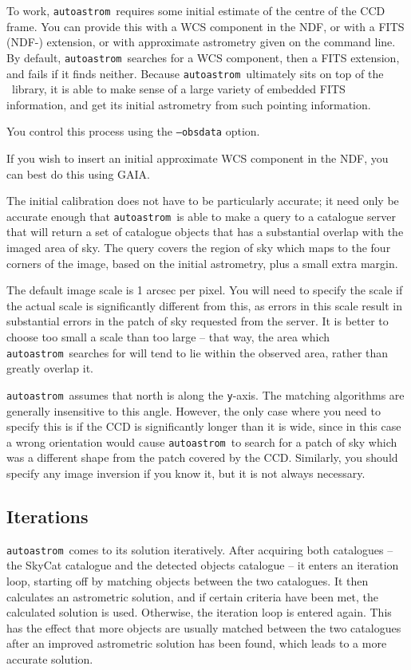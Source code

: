 \documentclass[twoside,11pt,nolof]{starlink}
\providecommand{\AST}{\xref{{\footnotesize AST}}{sun210}{}}
\providecommand{\autoastrom}{\texttt{autoastrom}}
\providecommand{\GAIA}{{\footnotesize GAIA}\normalsize}
\begin{document}
To work, \autoastrom\ requires some initial estimate of the centre of the CCD
frame. You can provide this with a WCS component in the NDF, or with a FITS
(NDF-) extension, or with approximate astrometry given on the command line.
By default, \autoastrom\ searches for a WCS component, then a FITS extension,
and fails if it finds neither.  Because \autoastrom\ ultimately sits on top of
the \AST\ library, it is able to make sense of a large variety of embedded
FITS information, and get its initial astrometry from such pointing
information.

  You control this process using the \texttt{--obsdata} option.

  If you wish to insert an initial approximate WCS component in the NDF, you
  can best do this using \GAIA.

  The initial calibration does not have to be particularly accurate; it need
  only be accurate enough that \autoastrom\ is able to make a query to a
  catalogue server that will return a set of catalogue objects that has a
  substantial overlap with the imaged area of sky.  The query covers the
  region of sky which maps to the four corners of the image, based on the
  initial astrometry, plus a small extra margin.

  The default image scale is 1 arcsec per pixel.  You will need to specify the
  scale if the actual scale is significantly different from this, as errors in
  this scale result in substantial errors in the patch of sky requested from
  the server.  It is better to choose too small a scale than too large -- that
  way, the area which \autoastrom\ searches for will tend to lie within the
  observed area, rather than greatly overlap it.

  \autoastrom\ assumes that north is along the \texttt{y}-axis.  The matching
  algorithms are generally insensitive to this angle.  However, the only case
  where you need to specify this is if the CCD is significantly longer than it
  is wide, since in this case a wrong orientation would cause \autoastrom\ to
  search for a patch of sky which was a different shape from the patch covered
  by the CCD.  Similarly, you should specify any image inversion if you know
  it, but it is not always necessary.

\subsection{Iterations\label{sb:iterations}}

\autoastrom\ comes to its solution iteratively. After acquiring both
catalogues -- the SkyCat catalogue and the detected objects catalogue -- it
enters an iteration loop, starting off by matching objects between the two
catalogues. It then calculates an astrometric solution, and if certain
criteria have been met, the calculated solution is used. Otherwise, the
iteration loop is entered again. This has the effect that more objects are
usually matched between the two catalogues after an improved astrometric
solution has been found, which leads to a more accurate solution.
\end{document}
